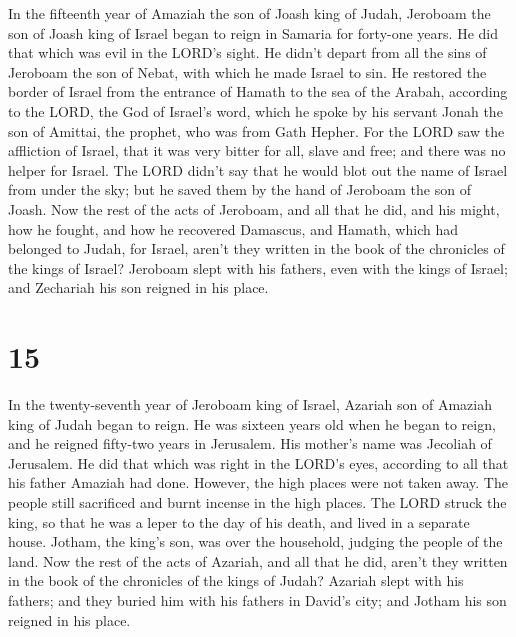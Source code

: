  In the fifteenth year of Amaziah the son of Joash king
of Judah, Jeroboam the son of Joash king of Israel began to reign in
Samaria for forty-one years.  He did that which was evil
in the LORD's sight. He didn't depart from all the sins of Jeroboam the
son of Nebat, with which he made Israel to sin.  He
restored the border of Israel from the entrance of Hamath to the sea of
the Arabah, according to the LORD, the God of Israel's word, which he
spoke by his servant Jonah the son of Amittai, the prophet, who was from
Gath Hepher.  For the LORD saw the affliction of Israel,
that it was very bitter for all, slave and free; and there was no helper
for Israel.  The LORD didn't say that he would blot out
the name of Israel from under the sky; but he saved them by the hand of
Jeroboam the son of Joash.  Now the rest of the acts of
Jeroboam, and all that he did, and his might, how he fought, and how he
recovered Damascus, and Hamath, which had belonged to Judah, for Israel,
aren't they written in the book of the chronicles of the kings of
Israel?  Jeroboam slept with his fathers, even with the
kings of Israel; and Zechariah his son reigned in his place.

\hypertarget{section-14}{%
\section{15}\label{section-14}}

 In the twenty-seventh year of Jeroboam king of Israel,
Azariah son of Amaziah king of Judah began to reign.  He
was sixteen years old when he began to reign, and he reigned fifty-two
years in Jerusalem. His mother's name was Jecoliah of Jerusalem.
 He did that which was right in the LORD's eyes, according
to all that his father Amaziah had done.  However, the
high places were not taken away. The people still sacrificed and burnt
incense in the high places.  The LORD struck the king, so
that he was a leper to the day of his death, and lived in a separate
house. Jotham, the king's son, was over the household, judging the
people of the land.  Now the rest of the acts of Azariah,
and all that he did, aren't they written in the book of the chronicles
of the kings of Judah?  Azariah slept with his fathers;
and they buried him with his fathers in David's city; and Jotham his son
reigned in his place.

